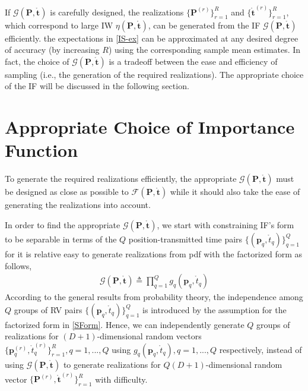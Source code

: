 \documentclass[review]{elsarticle}
\begin{document}
If $\mathcal{G}(\boldsymbol{P},\mathring{\boldsymbol{t}})$ is carefully designed, the realizations $\lbrace \boldsymbol{P}^{(r)}\rbrace_{r=1}^R$ and $\lbrace \mathring{\boldsymbol{t}}^{(r)}\rbrace_{r=1}^R$, which correspond to large IW $\eta(\boldsymbol{P},\mathring{\boldsymbol{t}})$, can be generated from the IF $\mathcal{G}(\boldsymbol{P},\mathring{\boldsymbol{t}})$ efficiently. the expectations in \eqref{IS-ex} can be approximated at any desired degree of accuracy (by increasing $R$) using the corresponding sample mean estimates.
In fact, the choice of $\mathcal{G}(\boldsymbol{P},\mathring{\boldsymbol{t}})$ is a tradeoff between the ease and efficiency of sampling (i.e., the generation of the required realizations). The appropriate choice of the IF will be discussed in the following section. 

\section{Appropriate Choice of Importance Function}
To generate the required realizations efficiently, the appropriate $\mathcal{G}(\boldsymbol{P},\mathring{\boldsymbol{t}})$ must be designed as close as possible to $\mathcal{F}(\boldsymbol{P},\mathring{\boldsymbol{t}})$ while it should also take the ease of generating the realizations into account. 

In order to find the appropriate $\mathcal{G}(\boldsymbol{P},\mathring{\boldsymbol{t}})$, we start with constraining IF's form to be separable in terms of the $Q$ position-transmitted time pairs $\lbrace(\boldsymbol{p}_q,\mathring{t}_q)\rbrace_{q=1}^Q$ for it is relative easy to generate realizations from pdf with the factorized form as follows,
\begin{align}\label{SForm}
    \mathcal{G}(\boldsymbol{P},\mathring{\boldsymbol{t}})\triangleq \prod_{q=1}^Q g_q(\boldsymbol{p}_q,\mathring{t}_q)
\end{align}
According to the general results from probability theory, the independence among $Q$ groups of RV pairs $\lbrace(\boldsymbol{p}_q,\mathring{t}_q)\rbrace_{q=1}^Q$ is introduced by the assumption for the factorized form in \eqref{SForm}. Hence, we can independently generate $Q$ groups of realizations for $(D+1)$-dimensional random vectors $\lbrace\boldsymbol{p}_q^{(r)},\mathring{t}_q^{(r)}\rbrace_{r=1}^{R},q=1,...,Q$ using $g_q(\boldsymbol{p}_q,\mathring{t}_q),q=1,...,Q$ respectively, instead of using $\mathcal{G}(\boldsymbol{P},\mathring{\boldsymbol{t}})$ to generate realizations for $Q(D+1)$-dimensional random vector $\lbrace\boldsymbol{P}^{(r)},\mathring{\boldsymbol{t}}^{(r)}\rbrace_{r=1}^{R}$ with difficulty. 
\end{document}

